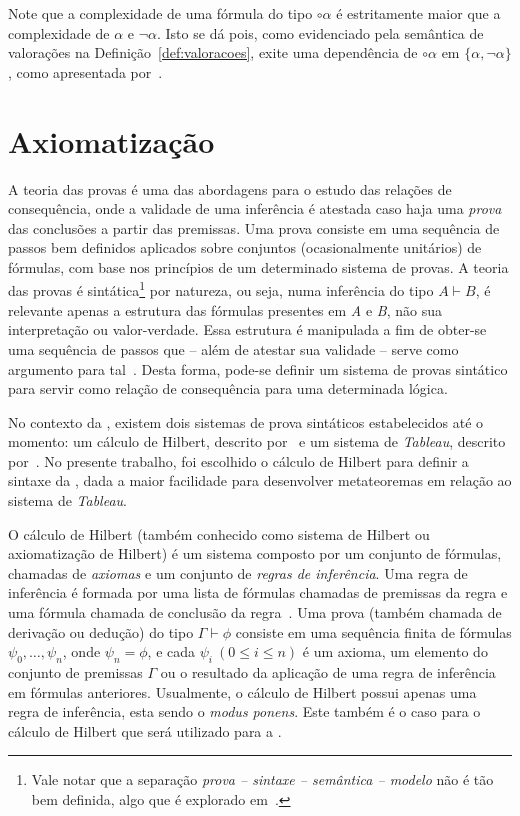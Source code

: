     Note que a complexidade de uma fórmula do tipo $\circ \alpha$ é estritamente maior que a complexidade de $\alpha$ e $\neg \alpha$. Isto se dá pois, como evidenciado pela semântica de valorações na Definição~\ref{def:valoracoes}, exite uma dependência de $\circ \alpha$ em $\{\alpha, \neg \alpha\}$, como apresentada por~.

\section{Axiomatização}\label{sec:axiomatizacao}

    A teoria das provas é uma das abordagens para o estudo das relações de consequência, onde a validade de uma inferência é atestada caso haja uma \textit{prova} das conclusões a partir das premissas. Uma prova consiste em uma sequência de passos bem definidos aplicados sobre conjuntos (ocasionalmente unitários) de fórmulas, com base nos princípios de um determinado sistema de provas. A teoria das provas é sintática\footnote{Vale notar que a separação \textit{prova {--} sintaxe {--} semântica {--} modelo} não é tão bem definida, algo que é explorado em~.} por natureza, ou seja, numa inferência do tipo $A \vdash B$, é relevante apenas a estrutura das fórmulas presentes em \textit{A} e \textit{B}, não sua interpretação ou valor-verdade. Essa estrutura é manipulada a fim de obter-se uma sequência de passos que {--} além de atestar sua validade {--} serve como argumento para tal~\cite{sep-logical-consequence}. Desta forma, pode-se definir um sistema de provas sintático para servir como relação de consequência para uma determinada lógica. 

    No contexto da \lfium{}, existem dois sistemas de prova sintáticos estabelecidos até o momento: um cálculo de Hilbert, descrito por~ e um sistema de \textit{Tableau}, descrito por~. No presente trabalho, foi escolhido o cálculo de Hilbert para definir a sintaxe da \lfium{}, dada a maior facilidade para desenvolver metateoremas em relação ao sistema de \textit{Tableau}.

    O cálculo de Hilbert (também conhecido como sistema de Hilbert ou axiomatização de Hilbert) é um sistema composto por um conjunto de fórmulas, chamadas de \textit{axiomas} e um conjunto de \textit{regras de inferência}. Uma regra de inferência é formada por uma lista de fórmulas chamadas de premissas da regra e uma fórmula chamada de conclusão da regra~\cite{Restall1999-RESAIT-4}. Uma prova (também chamada de derivação ou dedução) do tipo $\Gamma \vdash \phi$ consiste em uma sequência finita de fórmulas \(\psi_0, \dots, \psi_n\), onde \(\psi_n = \phi\), e cada  $\psi_i\ (0 \leq i \leq n)$ é um axioma, um elemento do conjunto de premissas $\Gamma$ ou o resultado da aplicação de uma regra de inferência em fórmulas anteriores. Usualmente, o cálculo de Hilbert possui apenas uma regra de inferência, esta sendo o \textit{modus ponens}. Este também é o caso para o cálculo de Hilbert que será utilizado para a \lfium{}.
    
